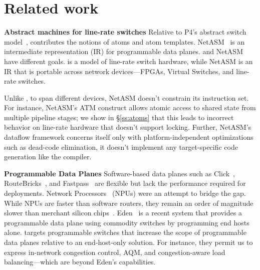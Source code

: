 \section{Related work}
\label{s:related}

\textbf{Abstract machines for line-rate switches}
Relative to P4's abstract switch model~\cite{p4}, \absmachine contributes the
notions of atoms and atom templates. NetASM~\cite{netasm} is an intermediate
representation (IR) for programmable data planes. \absmachine and NetASM have
different goals. \absmachine is a model of line-rate switch hardware, while
NetASM is an IR that is portable across network devices---FPGAs, Virtual
Switches, and line-rate switches.

Unlike \absmachine, to span different devices, NetASM doesn't constrain its
instruction set. For instance, NetASM's ATM construct allows atomic access to
shared state from multiple pipeline stages; we show in \S\ref{ss:atoms} that
this leads to incorrect behavior on line-rate hardware that doesn't support
locking.  Further, NetASM's dataflow framework concerns itself only with
platform-independent optimizations such as dead-code elimination, it doesn't
implement any target-specific code generation like the \pktlanguage compiler.

\textbf{Programmable Data Planes}
Software-based data planes such as Click~\cite{click},
RouteBricks~\cite{routebricks}, and Fastpass~\cite{fastpass} are flexible but
lack the performance required for deployments. Network
Processors~\cite{ixp2800, ixp4xx} (NPUs) were an attempt to bridge the gap.
While NPUs are faster than software routers, they remain an order of magnitude
slower than merchant silicon chips~\cite{rmt}. Eden~\cite{eden} is a recent
system that provides a programmable data plane using commodity switches by
programming end hosts alone. \pktlanguage targets programmable switches that
increase the scope of programmable data planes relative to an end-host-only
solution. For instance, they permit us to express in-network congestion
control, AQM, and congestion-aware load balancing---which are beyond Eden's
capabilities.

